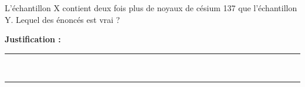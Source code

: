 L'échantillon X contient deux fois plus de noyaux de césium 137 que l'échantillon Y. Lequel des énoncés est vrai ?

\choices

\noindent\textbf{Justification :} \hrulefill \\[2.5ex]
\rule{\linewidth}{0.4pt} \\[2.5ex]
\rule{\linewidth}{0.4pt}
\vfill
